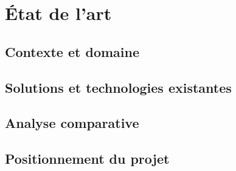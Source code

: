 \section{État de l'art}
\label{sec:etat-de-lart}

\subsection{Contexte et domaine}

\subsection{Solutions et technologies existantes}

\subsection{Analyse comparative}

\subsection{Positionnement du projet}
